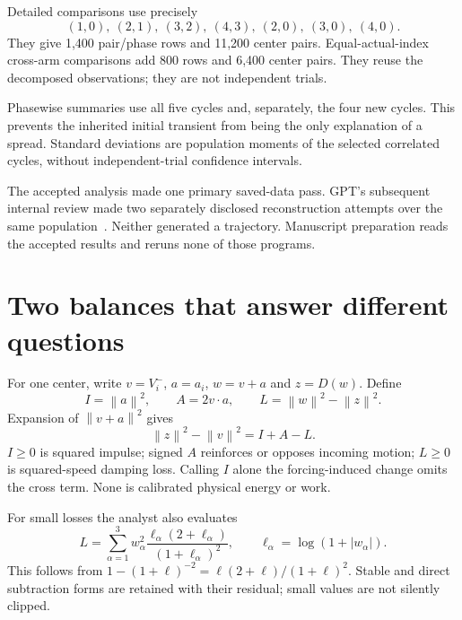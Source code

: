 \documentclass[11pt,a4paper]{article}
\newcommand{\norm}[1]{\left\lVert #1\right\rVert}
\begin{document}
Detailed comparisons use precisely
\[
(1,0),\ (2,1),\ (3,2),\ (4,3),\ (2,0),\ (3,0),\ (4,0).
\]
They give 1,400 pair/phase rows and 11,200 center pairs. Equal-actual-index cross-arm comparisons add 800 rows and 6,400 center pairs. They reuse the decomposed observations; they are not independent trials.

Phasewise summaries use all five cycles and, separately, the four new cycles. This prevents the inherited initial transient from being the only explanation of a spread. Standard deviations are population moments of the selected correlated cycles, without independent-trial confidence intervals.

The accepted analysis made one primary saved-data pass. GPT's subsequent internal review made two separately disclosed reconstruction attempts over the same population~\cite{review,reviewaccount}. Neither generated a trajectory. Manuscript preparation reads the accepted results and reruns none of those programs.

\clearpage
\section{Two balances that answer different questions}
\label{sec:balances}
For one center, write $v=V_i^-$, $a=a_i$, $w=v+a$ and $z=D(w)$. Define
\begin{equation}
I=\norm a^2,\qquad A=2v\cdot a,\qquad L=\norm w^2-\norm z^2.
\label{eq:IAL}
\end{equation}
Expansion of $\norm{v+a}^2$ gives
\begin{equation}
\norm z^2-\norm v^2=I+A-L.
\label{eq:squarebalance}
\end{equation}
$I\ge0$ is squared impulse; signed $A$ reinforces or opposes incoming motion; $L\ge0$ is squared-speed damping loss. Calling $I$ alone the forcing-induced change omits the cross term. None is calibrated physical energy or work.

For small losses the analyst also evaluates
\begin{equation}
L=\sum_{\alpha=1}^3 w_\alpha^2
\frac{\ell_\alpha(2+\ell_\alpha)}{(1+\ell_\alpha)^2},
\qquad \ell_\alpha=\log(1+|w_\alpha|).
\label{eq:stableloss}
\end{equation}
This follows from $1-(1+\ell)^{-2}=\ell(2+\ell)/(1+\ell)^2$. Stable and direct subtraction forms are retained with their residual; small values are not silently clipped.
\end{document}
